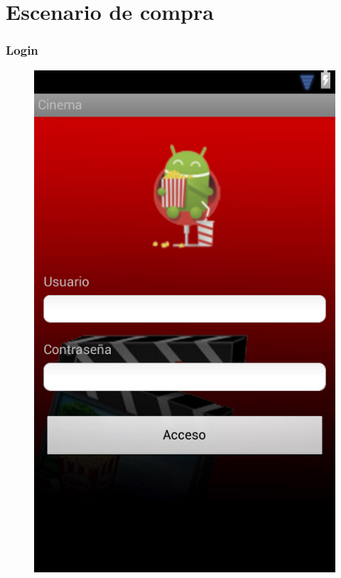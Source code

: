 \documentclass{beamer}
\begin{document}
\section{Escenario de compra}
\begin{frame}[allowframebreaks]
\frametitle{Login}
\begin{figure}[h]
\centering
\includegraphics[height=0.8\textheight]{acceso.jpg}
\end{figure}
\end{frame}
\end{document}
